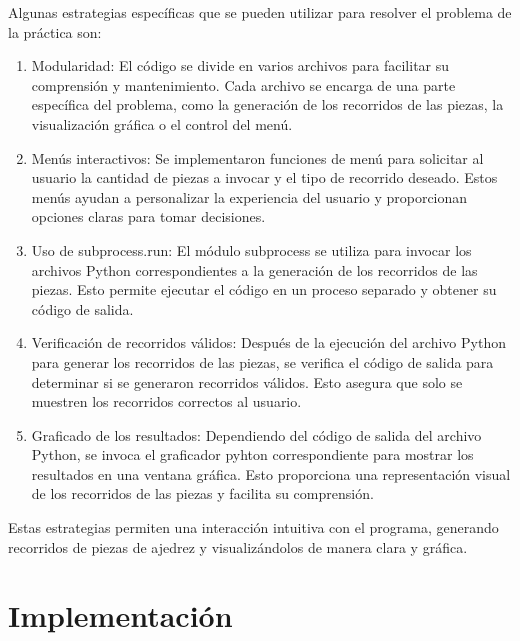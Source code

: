 Algunas estrategias específicas que se pueden utilizar para resolver el problema de la práctica son:
\begin{enumerate}
   \item Modularidad: El código se divide en varios archivos para facilitar su comprensión y mantenimiento. Cada archivo se encarga de una parte específica del problema, como la generación de los recorridos de las piezas, la visualización gráfica o el control del menú.\newline

    \item Menús interactivos: Se implementaron funciones de menú para solicitar al usuario la cantidad de piezas a invocar y el tipo de recorrido deseado. Estos menús ayudan a personalizar la experiencia del usuario y proporcionan opciones claras para tomar decisiones.\newline
    
    \item Uso de subprocess.run: El módulo subprocess se utiliza para invocar los archivos Python correspondientes a la generación de los recorridos de las piezas. Esto permite ejecutar el código en un proceso separado y obtener su código de salida.\newline
    
    \item Verificación de recorridos válidos: Después de la ejecución del archivo Python para generar los recorridos de las piezas, se verifica el código de salida para determinar si se generaron recorridos válidos. Esto asegura que solo se muestren los recorridos correctos al usuario.\newline
    
    \item Graficado de los resultados: Dependiendo del código de salida del archivo Python, se invoca el graficador pyhton correspondiente para mostrar los resultados en una ventana gráfica. Esto proporciona una representación visual de los recorridos de las piezas y facilita su comprensión.\newline
\end{enumerate}

Estas estrategias permiten una interacción intuitiva con el programa, generando recorridos de piezas de ajedrez y visualizándolos de manera clara y gráfica.\newline

\section{Implementación} 


